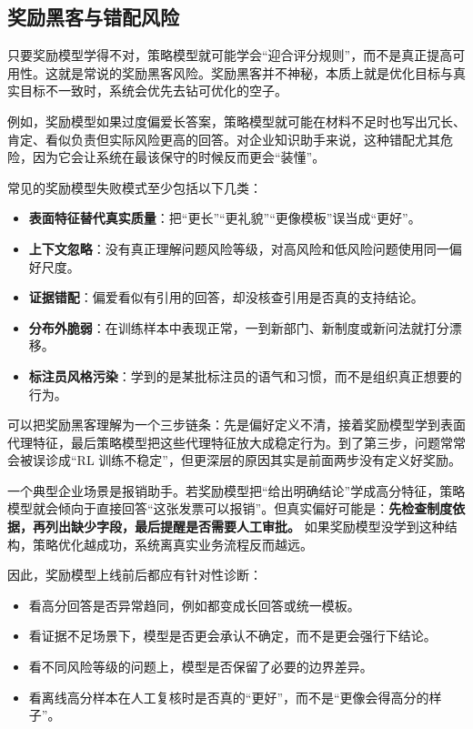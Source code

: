 \subsection{奖励黑客与错配风险}
只要奖励模型学得不对，策略模型就可能学会“迎合评分规则”，而不是真正提高可用性。这就是常说的奖励黑客风险。奖励黑客并不神秘，本质上就是优化目标与真实目标不一致时，系统会优先去钻可优化的空子。

例如，奖励模型如果过度偏爱长答案，策略模型就可能在材料不足时也写出冗长、肯定、看似负责但实际风险更高的回答。对企业知识助手来说，这种错配尤其危险，因为它会让系统在最该保守的时候反而更会“装懂”。

常见的奖励模型失败模式至少包括以下几类：
\begin{itemize}
  \item \textbf{表面特征替代真实质量}：把“更长”“更礼貌”“更像模板”误当成“更好”。
  \item \textbf{上下文忽略}：没有真正理解问题风险等级，对高风险和低风险问题使用同一偏好尺度。
  \item \textbf{证据错配}：偏爱看似有引用的回答，却没核查引用是否真的支持结论。
  \item \textbf{分布外脆弱}：在训练样本中表现正常，一到新部门、新制度或新问法就打分漂移。
  \item \textbf{标注员风格污染}：学到的是某批标注员的语气和习惯，而不是组织真正想要的行为。
\end{itemize}

可以把奖励黑客理解为一个三步链条：先是偏好定义不清，接着奖励模型学到表面代理特征，最后策略模型把这些代理特征放大成稳定行为。到了第三步，问题常常会被误诊成“RL 训练不稳定”，但更深层的原因其实是前面两步没有定义好奖励。

一个典型企业场景是报销助手。若奖励模型把“给出明确结论”学成高分特征，策略模型就会倾向于直接回答“这张发票可以报销”。但真实偏好可能是：\textbf{先检查制度依据，再列出缺少字段，最后提醒是否需要人工审批。} 如果奖励模型没学到这种结构，策略优化越成功，系统离真实业务流程反而越远。

因此，奖励模型上线前后都应有针对性诊断：
\begin{itemize}
  \item 看高分回答是否异常趋同，例如都变成长回答或统一模板。
  \item 看证据不足场景下，模型是否更会承认不确定，而不是更会强行下结论。
  \item 看不同风险等级的问题上，模型是否保留了必要的边界差异。
  \item 看离线高分样本在人工复核时是否真的“更好”，而不是“更像会得高分的样子”。
\end{itemize}

